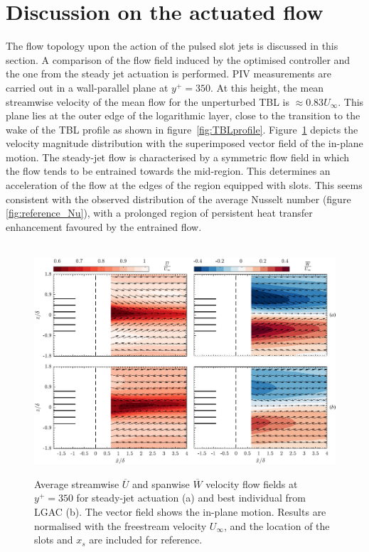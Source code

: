 \section{Discussion on the actuated flow}\label{s:discussion}
%
The flow topology upon the action of the pulsed slot jets is discussed in this section. A comparison of the flow field induced by the optimised controller and the one from the steady jet actuation is performed. PIV measurements are carried out in a wall-parallel plane at $y^+=350$. At this height, the mean streamwise velocity of the mean flow for the unperturbed TBL is $\approx 0.83U_\infty$.  This plane lies at the outer edge of the logarithmic layer, close to the transition to the wake of the TBL profile as shown in figure~\ref{fig:TBLprofile}. Figure~\ref{fig:PIV} depicts the velocity magnitude distribution with the superimposed vector field of the in-plane motion. The steady-jet flow is characterised by a symmetric flow field in which the flow tends to be entrained towards the mid-region. This determines an acceleration of the flow at the edges of the region equipped with slots. This seems consistent with the observed distribution of the average Nusselt number (figure \ref{fig:reference_Nu}), with a prolonged region of persistent heat transfer enhancement favoured by the entrained flow.

\begin{figure}[t] %
    \centering\
    \includegraphics[width=0.9\linewidth]{figures/F11.pdf}
    \caption{Average streamwise $\overline{U}$ and spanwise $\overline{W}$ velocity flow fields at $y^+ = 350$ for steady-jet actuation (a) and best individual from LGAC (b). The vector field shows the in-plane motion. Results are normalised with the freestream velocity $U_\infty$, and the location of the slots  and $x_{s}$  are included for reference.}
    \label{fig:PIV}
\end{figure}

